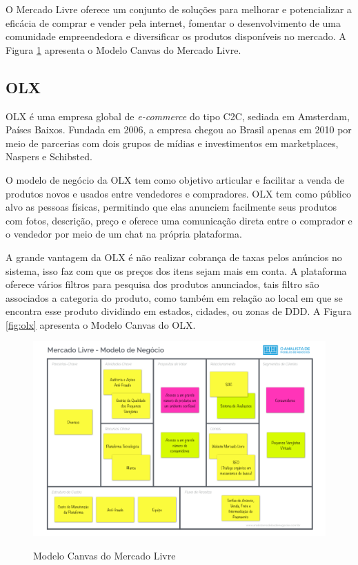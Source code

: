 O Mercado Livre oferece um conjunto de soluções para melhorar e potencializar a eficácia de comprar e vender pela internet, fomentar o desenvolvimento de uma comunidade empreendedora e diversificar os produtos disponíveis no mercado. A Figura \ref{fig:livre} apresenta o Modelo Canvas do Mercado Livre.

\subsection{OLX}

OLX é uma empresa global de \textit{e-commerce} do tipo C2C, sediada em Amsterdam, Países Baixos. Fundada em 2006, a empresa chegou ao Brasil apenas em 2010 por meio de parcerias com dois grupos de mídias e investimentos em marketplaces, Naspers e Schibsted.

O modelo de negócio da OLX tem como objetivo articular e facilitar a venda de produtos novos e usados entre vendedores e compradores. OLX tem como público alvo as pessoas físicas, permitindo que elas anunciem facilmente seus produtos com fotos, descrição, preço e oferece uma comunicação direta entre o comprador e o vendedor por meio de um chat na própria plataforma.

A grande vantagem da OLX é não realizar cobrança de taxas pelos anúncios no sistema, isso faz com que os preços dos itens sejam mais em conta. A plataforma oferece vários filtros para pesquisa dos produtos anunciados, tais filtro são associados a categoria do produto, como também em relação ao local em que se encontra esse produto dividindo em estados, cidades, ou zonas de DDD. A Figura \ref{fig:olx} apresenta o Modelo Canvas do OLX.

\begin{figure}[h]
  \centering
  \caption{Modelo Canvas do Mercado Livre}
  \includegraphics[width=1\textwidth]{figs/canvas_livre_1.png}
    \label{fig:livre}
\end{figure}

